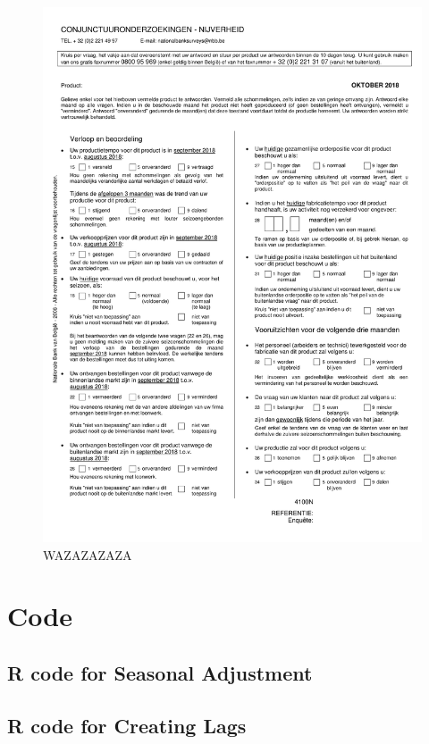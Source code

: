 \documentclass[12pt,a4paper,oneside]{book}
\begin{document}
\newpage
\begin{figure}[H]
    \centering
    \includegraphics[scale=0.75]{Images/IndustryN.pdf}
    \caption{WAZAZAZAZA}
    \label{B_pred}
\end{figure}





\chapter*{Code}
\section*{R code for Seasonal Adjustment}


\section*{R code for Creating Lags}
\end{document}
